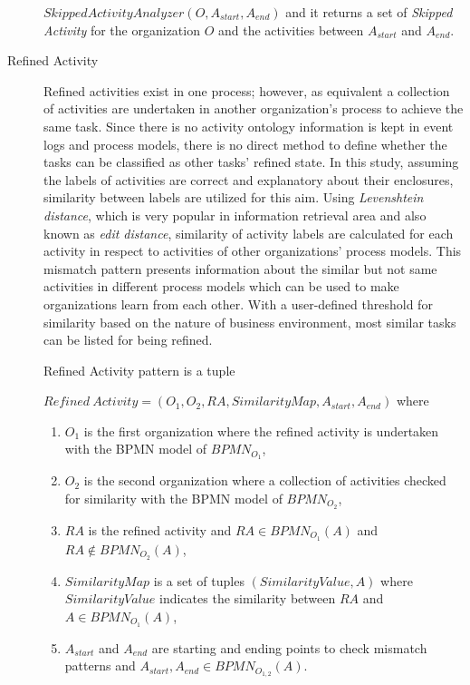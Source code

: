 \begin{description}
\begin{definition}
		$SkippedActivityAnalyzer(O, A_{start}, A_{end})$ and it returns a set of \textit{Skipped Activity} for the organization $O$ and the activities between $A_{start}$ and $A_{end}$.
		\end{definition}
  \item[Refined Activity] Refined activities exist in one process; however, as equivalent a collection of activities are undertaken in another organization's process to achieve the same task. Since there is no activity ontology information is kept in event logs and process models, there is no direct method to define whether the tasks can be classified as other tasks' refined state. In this study, assuming the labels of activities are correct and explanatory about their enclosures, similarity between labels are utilized for this aim. Using \textit{Levenshtein distance}, which is very popular in information retrieval area and also known as \textit{edit distance}, similarity of activity labels are calculated for each activity in respect to activities of other organizations' process models. This mismatch pattern presents information about the similar but not same activities in different process models which can be used to make organizations learn from each other. With a user-defined threshold for similarity based on the nature of business environment, most similar tasks can be listed for being refined.
		\theoremstyle{definition}
		\begin{definition}
		Refined Activity pattern is a tuple 

		${Refined\ Activity} = (O_{1}, O_{2}, RA, SimilarityMap, A_{start}, A_{end}) $ where 
		\begin{enumerate}
		  \item $O_{1}$ is the first organization where the refined activity is undertaken with the BPMN model of $BPMN_{{O}_{1}}$,
		  \item $O_{2}$ is the second organization where a collection of activities checked for similarity with the BPMN model of $BPMN_{{O}_{2}}$,
		  \item $RA$ is the refined activity and $RA \in BPMN_{{O}_{1}}(A)$ and $RA \notin BPMN_{{O}_{2}}(A)$,
		  \item $SimilarityMap$ is a set of tuples $(SimilarityValue, A)$ where $SimilarityValue$ indicates the similarity between $RA$ and $A \in BPMN_{{O}_{1}}(A)$, 
 		  \item $A_{start}$ and $A_{end}$ are starting and ending points to check mismatch patterns and $A_{start}, A_{end} \in BPMN_{{O}_{1,2}}(A)$. 
		\end{enumerate}
		\end{definition}


\end{description}
